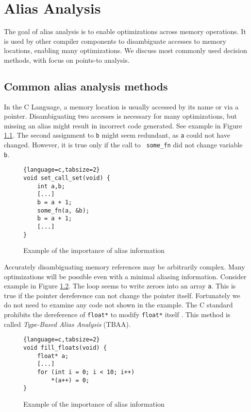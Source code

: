 \chapter{Alias Analysis}

The goal of alias analysis is to enable optimizations across memory operations.
It is used by other compiler components to disambiguate accesses to memory
locations, enabling many optimizations. We discuss most commonly used decision
methods, with focus on points-to analysis.

\section{Common alias analysis methods}

In the C Language, a memory location is usually accessed by its name or via a
pointer. Disambiguating two accesses is necessary for many optimizations, but missing an
alias might result in incorrect code generated. See example in Figure
\ref{alias-example1}. The second assignment to {\tt b} might seem redundant, as
{\tt a} could not have changed.  However, it is true only if the call to {\tt
some\_fn} did not change variable {\tt b}.

\begin{figure}[!ht]
\begin{tcolorbox}
\begin{lstlisting}{language=c,tabsize=2}
void set_call_set(void) {
	int a,b;
	[...]
	b = a + 1;
	some_fn(a, &b);
	b = a + 1;
	[...]
}
\end{lstlisting}
\end{tcolorbox}
\caption{Example of the importance of alias information}
\label{alias-example1}
\end{figure}

Accurately disambiguating memory references may be arbitrarily complex. Many
optimizations will be possible even with a minimal aliasing information.
Consider example in Figure \ref{alias-example2}. The loop seems to write zeroes
into an array {\tt a}. This is true if the pointer dereference can not
change the pointer itself. Fortunately we do not need to examine any code not
shown in the example. The C standard prohibits the dereference of {\tt float*}
to modify {\tt float*} itself \cite{isoc}. This method is called {\it Type-Based
Alias Analysis} (TBAA).

\begin{figure}[!ht]
\begin{tcolorbox}
\begin{lstlisting}{language=c,tabsize=2}
void fill_floats(void) {
	float* a;
	[...]
	for (int i = 0; i < 10; i++)
		*(a++) = 0;
}
\end{lstlisting}
\end{tcolorbox}
	\caption{Example of the importance of alias information}
	\label{alias-example2}
\end{figure}

